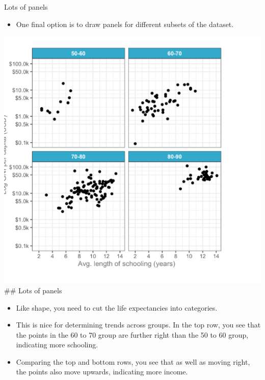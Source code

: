 \documentclass[
  ignorenonframetext,
]{beamer}
\providecommand{\tightlist}{%
  \setlength{\itemsep}{0pt}\setlength{\parskip}{0pt}}
\begin{document}
\begin{frame}{Lots of panels}
\label{lots-of-panels}
\begin{itemize}
\tightlist
\item
  One final option is to draw panels for different subsets of the
  dataset.
\end{itemize}

\includegraphics{../images/im70.png}\\
\#\# Lots of panels

\begin{itemize}
\item
  Like shape, you need to cut the life expectancies into categories.
\item
  This is nice for determining trends across groups. In the top row, you
  see that the points in the 60 to 70 group are further right than the
  50 to 60 group, indicating more schooling.
\item
  Comparing the top and bottom rows, you see that as well as moving
  right, the points also move upwards, indicating more income.
\end{itemize}
\end{frame}
\end{document}
